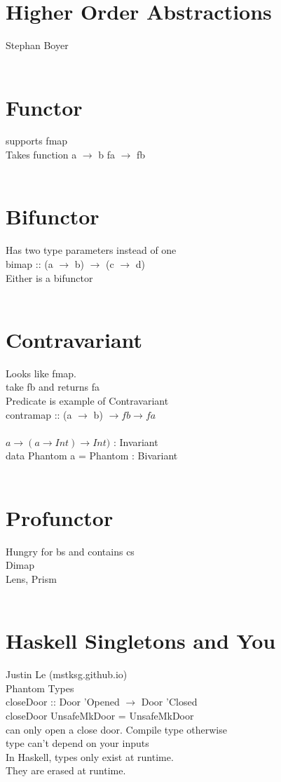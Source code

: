 \documentclass{article}
\begin{document}
\section{Higher Order Abstractions}
Stephan Boyer
\\
\\
\section{Functor}
supports fmap
\\
Takes function a $\rightarrow$ b fa $\rightarrow$ fb
\\
\\
\section{Bifunctor}
Has two type parameters instead of one
\\
bimap :: (a $\rightarrow$ b) $\rightarrow$ (c $\rightarrow$ d) 
\\
Either is a bifunctor
\\
\\
\section{Contravariant}
Looks like fmap.
\\
take fb and returns fa
\\
Predicate is example of Contravariant
\\
contramap :: (a $\rightarrow$ b) $\rightarrow f b \rightarrow f a$
\\
\\
$a \rightarrow (a \rightarrow Int) \rightarrow Int)$ : Invariant
\\
data Phantom a = Phantom : Bivariant
\\
\\
\section{Profunctor}
Hungry for bs and contains cs
\\
Dimap
\\
Lens, Prism
\\
\\
\section{Haskell Singletons and You}
Justin Le (mstksg.github.io)
\\
Phantom Types
\\
closeDoor :: Door 'Opened $\rightarrow$ Door 'Closed
\\
closeDoor UnsafeMkDoor = UnsafeMkDoor
\\
can only open a close door. Compile type otherwise
\\
type can't depend on your inputs
\\
In Haskell, types only exist at runtime.
\\
They are erased at runtime.
\\
\\
\end{document}
